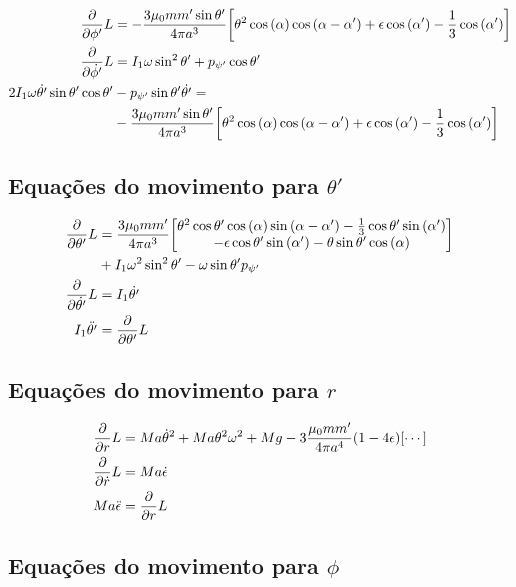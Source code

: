 \documentclass[a4paper, 12pt]{article}
\begin{document}
\begin{align}
    \pdv{}{\phi'}L&=-\frac{3\mu_0mm'\sin\theta'}{4\pi a^3}\qty[\theta^2\cos\qty(\alpha)\cos\qty(\alpha-\alpha')+\epsilon\cos\qty(\alpha')-\frac13\cos\qty(\alpha')]\nonumber\\
    \pdv{}{\dot{\phi'}}L&=I_1\omega\sin^2\theta'+p_{\psi'}\cos\theta'\nonumber\\
    2I_1\omega\dot{\theta'}\sin\theta'\cos\theta'&-p_{\psi'}\sin\theta'\dot{\theta'}=\nonumber\\
    &-\frac{3\mu_0mm'\sin\theta'}{4\pi a^3}\qty[\theta^2\cos\qty(\alpha)\cos\qty(\alpha-\alpha')+\epsilon\cos\qty(\alpha')-\frac13\cos\qty(\alpha')]
\end{align}

\subsection{Equações do movimento para $\theta'$}

\begin{align}
    \pdv{}{\theta'}L&=\frac{3\mu_0mm'}{4\pi a^3}\mqty[\theta^2\cos\theta'\cos\qty(\alpha)\sin\qty(\alpha-\alpha')-\frac13\cos\theta'\sin\qty(\alpha')\\
    -\epsilon\cos\theta'\sin\qty(\alpha')-\theta\sin\theta'\cos\qty(\alpha)]\nonumber\\
    &+I_1\omega^2\sin^2\theta'-\omega\sin\theta'p_{\psi'}\nonumber\\
    \pdv{}{\dot{\theta'}}L&=I_1\dot{\theta'}\nonumber\\
    I_1\ddot{\theta'}&=\pdv{}{\theta'}L
\end{align}

\subsection{Equações do movimento para $r$}

\begin{align}
    \pdv{}{r}L&=Ma\dot{\theta}^2+Ma\theta^2\omega^2+Mg-3\frac{\mu_0mm'}{4\pi a^4}\qty(1-4\epsilon)\qty[\cdots]\nonumber\\
    \pdv{}{\dot{r}}L&=Ma\dot{\epsilon}\nonumber\\
    Ma\ddot{\epsilon}&=\pdv{}{r}L
\end{align}

\subsection{Equações do movimento para $\phi$}
\end{document}
